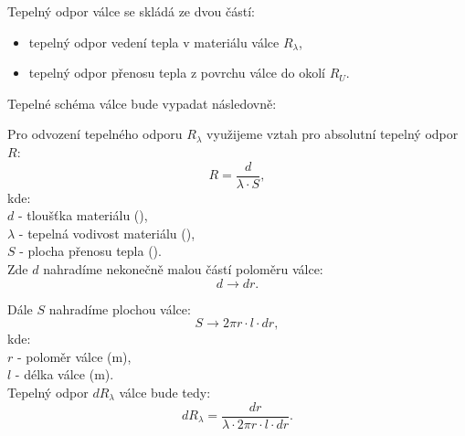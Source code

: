 \documentclass{article}
\begin{document}
Tepelný odpor válce se skládá ze dvou částí:
\begin{itemize}
    \item tepelný odpor vedení tepla v materiálu válce $R_\lambda$,
    \item tepelný odpor přenosu tepla z povrchu válce do okolí $R_U$.
\end{itemize}

Tepelné schéma válce bude vypadat následovně:

\begin{center}
\end{center}

Pro odvození tepelného odporu $R_\lambda$ využijeme vztah pro absolutní tepelný odpor $R$:
$$
    R = \frac{d}{\lambda \cdot S},
$$
kde:\\
$d$ - tloušťka materiálu (\uM),\\
$\lambda$ - tepelná vodivost materiálu (\ueqWandMinvKinv),\\
$S$ - plocha přenosu tepla (\ueqMsq).\\

Zde $d$ nahradíme nekonečně malou částí poloměru válce:
$$
    d \rightarrow dr.
$$

Dále $S$ nahradíme plochou válce:
$$
    S \rightarrow 2 \pi r \cdot l \cdot dr,
$$
kde:\\
$r$ - poloměr válce (m),\\
$l$ - délka válce (m).\\

Tepelný odpor $dR_\lambda$ válce bude tedy:
$$
    dR_\lambda = \frac{dr}{\lambda \cdot 2 \pi r \cdot l \cdot dr}.
$$
\end{document}
